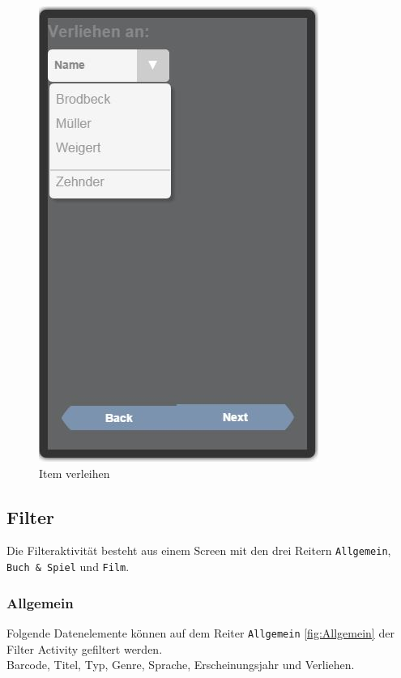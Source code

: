 \begin{figure}[htbp]
	\centering
	\includegraphics[scale=0.5]{pic/GUI/VerliehenAn}
	\caption{Item verleihen}
\end{figure}

\subsection{Filter}

Die Filteraktivität besteht aus einem Screen mit den drei Reitern {\color{IndianRed}\texttt{Allgemein}}, {\color{IndianRed}\texttt{Buch \& Spiel}} und {\color{IndianRed}\texttt{Film}}.

\subsubsection{Allgemein}

Folgende Datenelemente können auf dem Reiter {\color{IndianRed}\texttt{Allgemein}} \ref{fig:Allgemein} der Filter Activity gefiltert werden.\\

Barcode, Titel, Typ, Genre, Sprache, Erscheinungsjahr und Verliehen.

